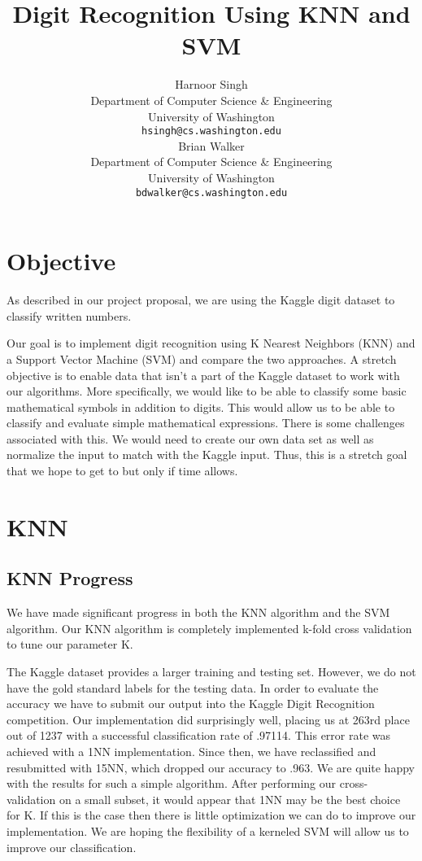 \documentclass{article} %
\title{Digit Recognition Using KNN and SVM}
\author{
Harnoor Singh \\
Department of Computer Science \& Engineering\\
University of Washington \\
\texttt{hsingh@cs.washington.edu} \\
\And
Brian Walker \\
Department of Computer Science \& Engineering \\
University of Washington \\
\texttt{bdwalker@cs.washington.edu} \\
}
\begin{document}
\maketitle

\section{Objective}

As described in our project proposal, we are using the Kaggle digit dataset to classify written numbers.

Our goal is to implement digit recognition using K Nearest Neighbors (KNN) and a Support Vector Machine (SVM) and compare the two approaches. A stretch objective is to enable data that isn't a part of the Kaggle dataset to work with our algorithms. More specifically, we would like to be able to classify some basic mathematical symbols in addition to digits.  This would allow us to be able to classify and evaluate simple mathematical expressions.  There is some challenges associated with this.  We would need to create our own data set as well as normalize the input to match with the Kaggle input.  Thus, this is a stretch goal that we hope to get to but only if time allows. 

\section{KNN}

\subsection{KNN Progress}

We have made significant progress in both the KNN algorithm and the SVM algorithm. Our KNN algorithm is completely implemented k-fold cross validation to tune our parameter K. 

The Kaggle dataset provides a larger training and testing set. However, we do not have the gold standard labels for the testing data. In order to evaluate the accuracy we have to submit our output into the Kaggle Digit Recognition competition.  Our implementation did surprisingly well, placing us at 263rd place out of 1237 with a successful classification rate of .97114.  This error rate was achieved with a 1NN implementation. Since then, we have reclassified and resubmitted with 15NN, which dropped our accuracy to .963.  We are quite happy with the results for such a simple algorithm. After performing our cross-validation on a small subset, it would appear that 1NN may be the best choice for K.  If this is the case then there is little optimization we can do to improve our implementation.  We are hoping the flexibility of a kerneled SVM will allow us to improve our classification.
\end{document}
